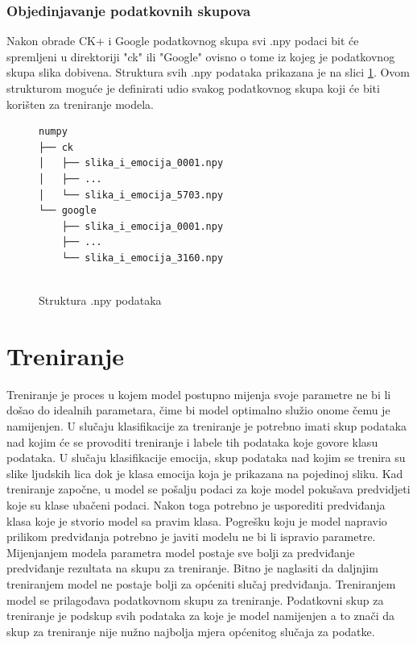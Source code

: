 \documentclass[times, utf8, zavrsni,numeric,pstricks]{fer}
\begin{document}
\subsection{Objedinjavanje podatkovnih skupova}
Nakon obrade CK+ i Google podatkovnog skupa svi .npy podaci bit će spremljeni u direktoriji "ck" ili "Google" ovisno o tome iz kojeg je podatkovnog skupa slika dobivena. Struktura svih .npy podataka prikazana je na slici \ref{pic:npy_structure}. Ovom strukturom moguće je definirati udio svakog podatkovnog skupa koji će biti korišten za treniranje modela.


\begin{figure}[H]
\centering
\begin{Verbatim}[fontsize=\small]
numpy
├── ck
│   ├── slika_i_emocija_0001.npy
│   ├── ...
│   └── slika_i_emocija_5703.npy
└── google
    ├── slika_i_emocija_0001.npy
    ├── ...
    └── slika_i_emocija_3160.npy
    

\end{Verbatim}
\caption{Struktura .npy podataka}
\label{pic:npy_structure}
\end{figure}



\chapter{Treniranje}
Treniranje je proces u kojem model postupno mijenja svoje parametre ne bi li došao do idealnih parametara, čime bi model optimalno služio onome čemu je namijenjen. U slučaju klasifikacije za treniranje je potrebno imati skup podataka nad kojim će se provoditi treniranje i labele tih podataka koje govore klasu podataka. U slučaju klasifikacije emocija, skup podataka nad kojim se trenira su slike ljudskih lica dok je klasa emocija koja je prikazana na pojedinoj sliku. Kad treniranje započne, u model se pošalju podaci za koje model pokušava predvidjeti koje su klase ubačeni podaci. Nakon toga potrebno je usporediti predviđanja klasa koje je stvorio model sa pravim klasa. Pogrešku koju je model napravio prilikom predviđanja potrebno je javiti modelu ne bi li ispravio parametre. Mijenjanjem modela parametra model postaje sve bolji za predviđanje predviđanje rezultata na skupu za treniranje. Bitno je naglasiti da daljnjim treniranjem model ne postaje bolji za općeniti slučaj predviđanja. Treniranjem model se prilagođava podatkovnom skupu za treniranje. Podatkovni skup za treniranje je podskup svih podataka za koje je model namijenjen a to znači da skup za treniranje nije nužno najbolja mjera općenitog slučaja za podatke. 
\end{document}
